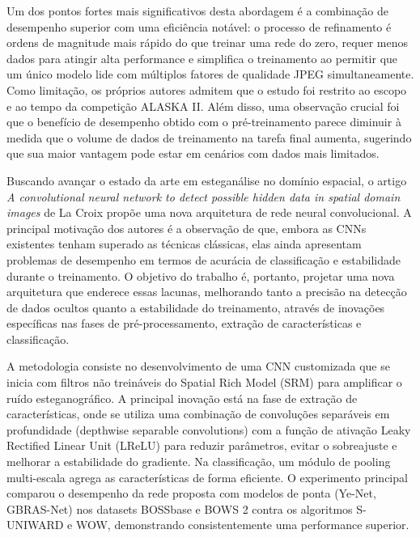 \documentclass[12pt]{article}
\begin{document}
Um dos pontos fortes mais significativos desta abordagem é a combinação de desempenho superior com uma eficiência notável: o processo de refinamento é ordens de magnitude mais rápido do que treinar uma rede do zero, requer menos dados para atingir alta performance e simplifica o treinamento ao permitir que um único modelo lide com múltiplos fatores de qualidade JPEG simultaneamente. Como limitação, os próprios autores admitem que o estudo foi restrito ao escopo e ao tempo da competição ALASKA II. Além disso, uma observação crucial foi que o benefício de desempenho obtido com o pré-treinamento parece diminuir à medida que o volume de dados de treinamento na tarefa final aumenta, sugerindo que sua maior vantagem pode estar em cenários com dados mais limitados.



Buscando avançar o estado da arte em esteganálise no domínio espacial, o artigo \textit{A convolutional neural network to detect possible hidden data in spatial domain images} de La Croix \cite{croix2023CNN} propõe uma nova arquitetura de rede neural convolucional. A principal motivação dos autores é a observação de que, embora as CNNs existentes tenham superado as técnicas clássicas, elas ainda apresentam problemas de desempenho em termos de acurácia de classificação e estabilidade durante o treinamento. O objetivo do trabalho é, portanto, projetar uma nova arquitetura que enderece essas lacunas, melhorando tanto a precisão na detecção de dados ocultos quanto a estabilidade do treinamento, através de inovações específicas nas fases de pré-processamento, extração de características e classificação.

A metodologia consiste no desenvolvimento de uma CNN customizada que se inicia com filtros não treináveis do Spatial Rich Model (SRM) para amplificar o ruído esteganográfico. A principal inovação está na fase de extração de características, onde se utiliza uma combinação de convoluções separáveis em profundidade (depthwise separable convolutions) com a função de ativação Leaky Rectified Linear Unit (LReLU) para reduzir parâmetros, evitar o sobreajuste e melhorar a estabilidade do gradiente. Na classificação, um módulo de pooling multi-escala agrega as características de forma eficiente. O experimento principal comparou o desempenho da rede proposta com modelos de ponta (Ye-Net, GBRAS-Net) nos datasets BOSSbase e BOWS 2 contra os algoritmos S-UNIWARD e WOW, demonstrando consistentemente uma performance superior.
\end{document}
